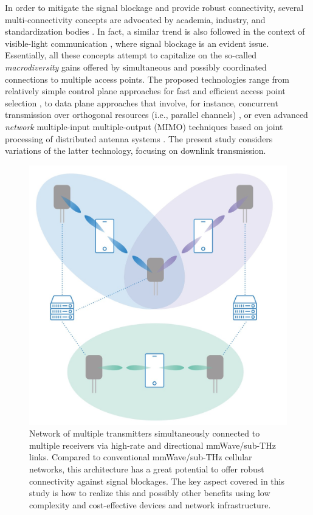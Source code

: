 \documentclass[10pt,journal,a4paper]{IEEEtran}
\begin{document}
\IEEEpubidadjcol
In order to mitigate the signal blockage and provide robust connectivity, several multi-connectivity concepts are advocated by academia, industry, and standardization bodies \cite{rappaport2019diversity,3gpp2020multiconnectivity,qualcomm2021comp,ericsson2023concept}. In fact, a similar trend is also followed in the context of visible-light communication \cite{jungnickel2019optical}, where signal blockage is an evident issue. Essentially, all these concepts attempt to capitalize on the so-called \textit{macrodiversity} gains offered by simultaneous and possibly coordinated connections to multiple access points. The proposed technologies range from relatively simple control plane approaches for fast and efficient access point selection \cite{skouroumounis2017base,giordani2018control,gerasimenko2019capacity}, to data plane approaches that involve, for instance, concurrent transmission over orthogonal resources (i.e., parallel channels) \cite{fettweis2019reliable}, or even advanced \textit{network} multiple-input multiple-output (MIMO) techniques based on joint processing of distributed antenna systems \cite{tuninetti2016coverage,fettweis2020network,tolli2021blockage}. The present study considers variations of the latter technology, focusing on downlink transmission.
\begin{figure}[t!]
\centering
\includegraphics[width=0.7\linewidth]{model}
\vspace{-0.3cm}
\caption{Network of multiple transmitters simultaneously connected to multiple receivers via high-rate and directional mmWave/sub-THz links. Compared to conventional mmWave/sub-THz cellular networks, this architecture has a great potential to offer robust connectivity against signal blockages. The key aspect covered in this study is how to realize this and possibly other benefits using low complexity and cost-effective devices and network infrastructure.}
\label{fig:model}
\vspace{-0.5cm}
\end{figure}
\end{document}
